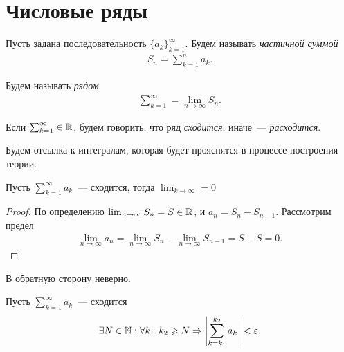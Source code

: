 \documentclass[../main.tex]{subfiles}
\begin{document}
\section{Числовые ряды}

\begin{definition}
  Пусть задана последовательность $\{ a_k  \}^{ \infty}_{k=1} $. Будем называть \emph{частичной суммой} 
  \begin{gather} 
    S_n = \sum_{k=1}^{n} a_k.
  \end{gather}  
\end{definition}


\begin{definition}
  Будем называть \emph{рядом} 
  \begin{gather} 
    \sum_{k=1}^{\infty} = \lim_{n \to \infty} S_n  .
  \end{gather}
\end{definition}


\begin{definition}
  Если $ \sum_{k=1}^{\infty} \in \mathbb{R}$, будем говорить, что ряд \emph{сходится}, иначе~--- \emph{расходится}. 
\end{definition}


\begin{note}
  Будем отсылка к интегралам, которая будет прояснятся в процессе построения теории.
\end{note}


\begin{proposition}
  Пусть $ \sum_{k=1}^{\infty} a_k $~--- сходится, тогда $\lim_{k \to \infty} = 0$  
\end{proposition}


\begin{proof}
  По определению $\lim_{n \to \infty} S_n = S \in \mathbb{R}$, и $a_n = S_n - S_{n-1}$. Рассмотрим предел 
  \begin{gather} 
    \lim_{n \to \infty} a_n = \lim_{n \to \infty} S_n - \lim_{n \to \infty} S_{n-1} = S- S = 0 .
  \end{gather}
\end{proof}


\begin{note}
  В обратную сторону неверно.
\end{note}


\begin{proposition}
  Пусть $ \sum_{k=1}^{\infty} a_k$~--- сходится \nas 
  \begin{gather} 
    \exists N \in \mathbb{N} : \forall k_1, k_2 \geqslant N \Rightarrow \left| \sum_{k=k_1 }^{k_2 } a_k  \right| < \varepsilon .
  \end{gather} 
\end{proposition}
\end{document}
